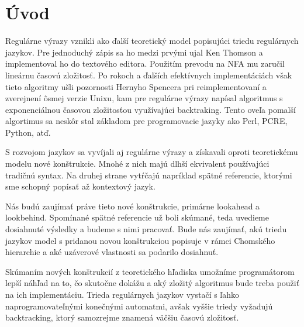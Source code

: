 {}
{}
\chapter*{Úvod}\label{chap:intro}

Regulárne výrazy vznikli ako ďalší teoretický model popisujúci triedu regulárnych jazykov. Pre jednoduchý zápis sa ho medzi prvými ujal Ken Thomson a implementoval ho do textového editora. Použitím prevodu na NFA mu zaručil lineárnu časovú zložitosť. Po rokoch a ďalších efektívnych implementáciách však tieto algoritmy ušli pozornosti Hernyho Spencera pri reimplementovaní a zverejnení ôsmej verzie Unixu, kam pre regulárne výrazy napísal algoritmus s exponenciálnou časovou zložitosťou využívajúci backtraking. Tento oveľa pomalší algortimus sa neskôr stal základom pre programovacie jazyky ako Perl, PCRE, Python, atď. \cite{Cox07SlowPython}

S rozvojom jazykov sa vyvíjali aj regulárne výrazy a získavali oproti teoretickému modelu nové konštrukcie. Mnohé z nich majú dlhší ekvivalent používajúci tradičnú syntax. Na druhej strane vytŕčajú napríklad spätné referencie, ktorými sme schopný popísať až kontextový jazyk.

Nás budú zaujímať práve tieto nové konštrukcie, primárne lookahead a lookbehind. Spomínané spätné referencie už boli skúmané, teda uvedieme dosiahnuté výsledky a budeme s nimi pracovať. Bude nás zaujímať, akú triedu jazykov model s pridanou novou konštrukciou popisuje v rámci Chomského hierarchie a aké uzáverové vlastnosti sa podarilo dosiahnuť.

Skúmaním nových konštrukcií z teoretického hľadiska umožníme programátorom lepší náhľad na to, čo skutočne dokážu a aký zložitý algoritmus bude treba použiť na ich implementáciu. Trieda regulárnych jazykov vystačí s ľahko naprogramovateľnými konečnými automatmi, avšak vyššie triedy vyžadujú backtracking, ktorý samozrejme znamená väčšiu časovú zložitosť.

